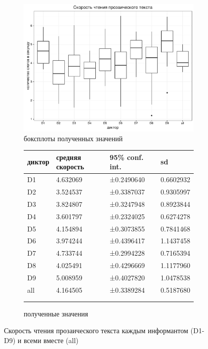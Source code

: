 \begin{figure}[t]
\begin{subfigure}[b]{0.53\textwidth}
        \includegraphics[width=\linewidth]{proseboxplot.pdf}
        \caption{боксплоты полученных значений}
\end{subfigure}
\hfill
\begin{subfigure}[b]{0.45\textwidth}
\small
\begin{tabular}{|l|l|l|l|}
\hline
диктор & средняя скорость & 95\% conf. int. & sd \\ \hline
D1 & 4.632069 & ±0.2490640 & 0.6602932 \\ \hline
D2 & 3.524537 & ±0.3387037 & 0.9305997 \\ \hline
D3 & 3.824807 & ±0.3247948 & 0.8923844 \\ \hline
D4 & 3.601797 & ±0.2324025 & 0.6274278 \\ \hline
D5 & 4.154894 & ±0.3073855 & 0.7841468 \\ \hline
D6 & 3.974244 & ±0.4396417 & 1.1437458 \\ \hline
D7 & 4.733744 & ±0.2994228 & 0.7165394 \\ \hline
D8 & 4.025491 & ±0.4296669 & 1.1177960 \\ \hline
D9 & 5.008959 & ±0.4027820 & 1.0478538 \\ \hline
all & 4.164505 & ±0.3389284 & 0.5187680 \\ \hline
\multicolumn{1}{c}{}&\multicolumn{1}{c}{}&\multicolumn{1}{c}{}&\multicolumn{1}{c}{}\\
\multicolumn{1}{c}{}&\multicolumn{1}{c}{}&\multicolumn{1}{c}{}&\multicolumn{1}{c}{}\\
\end{tabular}
\normalsize
\caption{полученные значения}        
\end{subfigure}
\caption{Скорость чтения прозаического текста каждым информантом (D1-D9) и всеми вместе (all)}
\label{proseboxplot}
\end{figure}
